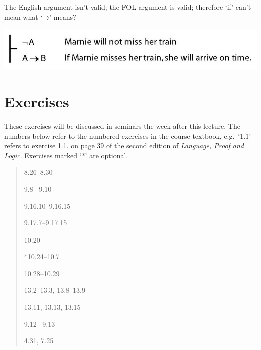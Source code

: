 \documentclass[12pt]{extarticle}
\begin{document}
\begin{multicols*}{3}
\begin{minipage}{\columnwidth}
 
The English argument isn't valid; the FOL argument is valid; therefore `if' can't mean what `→' means?
 
\begin{center}
\includegraphics[scale=0.3]{img/if_aint_arrow.png}
\end{center}
\end{minipage}
 
\vfill
\begin{minipage}{\columnwidth}
\section{Exercises}
These exercises will be discussed in seminars the week after this lecture.
The numbers below refer to the numbered exercises in the course textbook, e.g.\ `1.1' refers to exercise 1.1. on page 39 of the second edition of \emph{Language, Proof and Logic}. Exercises marked `*' are optional.
 
\begin{quote}
8.26--8.30
 
9.8–-9.10
 
9.16.10--9.16.15
 
9.17.7--9.17.15
 
10.20
 
*10.24--10.7
 
10.28--10.29
 
13.2--13.3, 13.8--13.9
 
13.11, 13.13, 13.15
 
9.12-–9.13
 
4.31, 7.25
 
\end{quote}
\end{minipage}


 

\end{multicols*}
\end{document}

